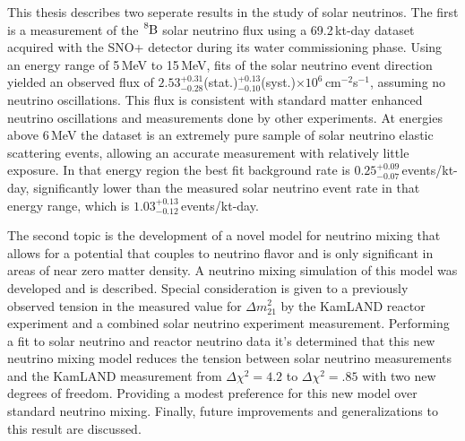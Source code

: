 

\begin{abstracts}
    This thesis describes two seperate results in the study of solar neutrinos.
    The first is
    a measurement of the $\ce{^{8}B}$ solar neutrino flux using a
    69.2\,kt-day dataset acquired with the
    SNO+ detector during its water
    commissioning phase.
    Using an energy range of 5\,MeV to 15\,MeV, fits of the solar neutrino event direction yielded an observed
    flux of
    $2.53^{+0.31}_{-0.28}$(stat.)$^{+0.13}_{-0.10}$(syst.)$\times10^6$\,cm$^{-2}$s$^{-1}$,
    assuming no neutrino oscillations.
    This flux is
    consistent with standard matter enhanced neutrino oscillations and measurements
    done by other experiments.
    At energies above 6\,MeV the dataset is an extremely
    pure sample of solar neutrino elastic scattering events,
    allowing
    an accurate measurement with relatively little exposure. In that energy
    region the best fit background rate is
    $0.25^{+0.09}_{-0.07}$\,events/kt-day, significantly
    lower than the measured solar neutrino event rate in that energy range,
    which is $1.03^{+0.13}_{-0.12}$\,events/kt-day.

    The second topic is the development of a novel model for neutrino mixing
    that allows for a potential that couples to neutrino
    flavor and is only significant in areas of near zero matter density.
    A neutrino mixing simulation of this model was developed and is described.
    Special consideration
    is given to a previously observed tension in the measured value
    for $\Delta m^{2}_{21}$ by the KamLAND reactor experiment and
    a combined solar neutrino experiment measurement.
    Performing a fit to solar neutrino and reactor neutrino
    data it's determined that this new neutrino mixing model reduces the tension
    between solar neutrino measurements and the KamLAND measurement
    from $\Delta \chi^{2}=4.2$ to $\Delta \chi^{2}=.85$ with
    two new degrees of freedom.
    Providing a modest preference for this new model over standard neutrino mixing.
    Finally, future improvements and generalizations to this result are discussed.
\end{abstracts}

